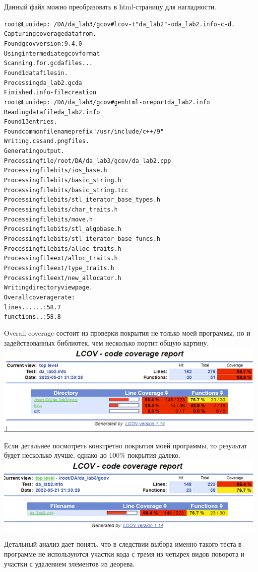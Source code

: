 \begin{enumerate}
    Данный файл можно преобразовать в html-страницу для нагладности.\newline
    \begin{alltt}
    root@Lunidep:~/DA/da_lab3/gcov# lcov -t "da_lab2" -o da_lab2.info -c -d . 
    Capturing coverage data from .
    Found gcov version: 9.4.0
    Using intermediate gcov format
    Scanning . for .gcda files ...
    Found 1 data files in .
    Processing da_lab2.gcda
    Finished .info-file creation
    root@Lunidep:~/DA/da_lab3/gcov# genhtml -o report da_lab2.info
    Reading data file da_lab2.info
    Found 13 entries.
    Found common filename prefix "/usr/include/c++/9"
    Writing .css and .png files.
    Generating output.
    Processing file /root/DA/da_lab3/gcov/da_lab2.cpp
    Processing file bits/ios_base.h
    Processing file bits/basic_string.h
    Processing file bits/basic_string.tcc
    Processing file bits/stl_iterator_base_types.h
    Processing file bits/char_traits.h
    Processing file bits/move.h
    Processing file bits/stl_algobase.h
    Processing file bits/stl_iterator_base_funcs.h
    Processing file bits/alloc_traits.h
    Processing file ext/alloc_traits.h
    Processing file ext/type_traits.h
    Processing file ext/new_allocator.h
    Writing directory view page.
    Overall coverage rate:
      lines......: 58.7%
      functions..: 58.8%
    \end{alltt}
    
    Overall coverage состоит из проверки покрытия не только моей программы, но и задействованных библиотек, чем несколько портит общую картину.\newline
    \includegraphics{images/all_proj.png}
    
    Если детальнее посмотреть конктретно покрытия моей программы, то результат будет несколько лучше, однако до 100\% покрытия далеко.\newline
    \includegraphics{images/my_prog.png}
    
    Детальный анализ дает понять, что в следствии выбора именно такого теста в программе не используются участки кода с тремя из четырех видов поворота и участки с удалением элементов из деорева.\newline
    
\end{enumerate}

\pagebreak